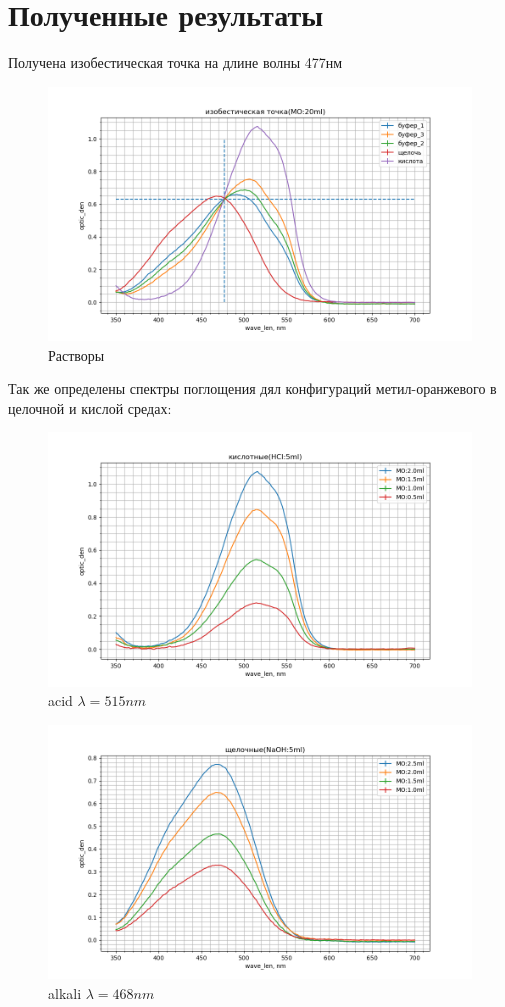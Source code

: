 \documentclass[a4paper, 12pt]{article}
\begin{document}
\newpage
\section{Полученные результаты}
Получена изобестическая точка на длине волны 477нм
\begin{figure}[h!]
    \centering
    \includegraphics[width=120mm]{./isobest.png}
    \caption{Растворы}
\end{figure}
Так же определены спектры поглощения дял конфигураций метил-оранжевого в целочной и кислой средах:
\begin{figure}[h!]
    \centering
    \includegraphics[width=120mm]{acid.png}
    \caption{acid $\lambda = 515nm$}
\end{figure}
\newpage
\begin{figure}[h!]
    \centering
    \includegraphics[width=120mm]{alkali.png}
    \caption{alkali $\lambda = 468nm$}
\end{figure}
\end{document}
